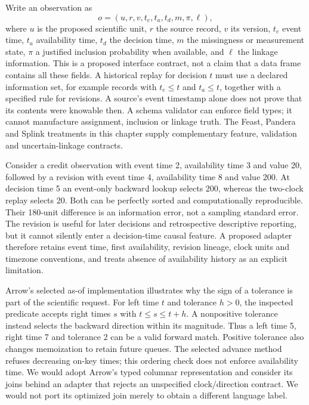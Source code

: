 Write an observation as
\[
 o=(u,r,v,t_e,t_a,t_d,m,\pi,\ell),
\]
where $u$ is the proposed scientific unit, $r$ the source record, $v$ its version, $t_e$ event time, $t_a$ availability time, $t_d$ the decision time, $m$ the missingness or measurement state, $\pi$ a justified inclusion probability when available, and $\ell$ the linkage information. This is a proposed interface contract, not a claim that a data frame contains all these fields. A historical replay for decision $t$ must use a declared information set, for example records with $t_e\leq t$ and $t_a\leq t$, together with a specified rule for revisions. A source's event timestamp alone does not prove that its contents were knowable then. A schema validator can enforce field types; it cannot manufacture assignment, inclusion or linkage truth. The Feast, Pandera and Splink treatments in this chapter supply complementary feature, validation and uncertain-linkage contracts.~\citep{exec19_feast_source,exec19_feast_reference,exec24_pandera_source,exec24_pandera_reference,exec24_splink_sources,exec24_splink_contract,exec25_dww_choice}

Consider a credit observation with event time 2, availability time 3 and value 20, followed by a revision with event time 4, availability time 8 and value 200. At decision time 5 an event-only backward lookup selects 200, whereas the two-clock replay selects 20. Both can be perfectly sorted and computationally reproducible. Their 180-unit difference is an information error, not a sampling standard error. The revision is useful for later decisions and retrospective descriptive reporting, but it cannot silently enter a decision-time causal feature. A proposed adapter therefore retains event time, first availability, revision lineage, clock units and timezone conventions, and treats absence of availability history as an explicit limitation.~\citep{exec25_dww_choice}

Arrow's selected as-of implementation illustrates why the sign of a tolerance is part of the scientific request. For left time $t$ and tolerance $h>0$, the inspected predicate accepts right times $s$ with $t\leq s\leq t+h$. A nonpositive tolerance instead selects the backward direction within its magnitude. Thus a left time 5, right time 7 and tolerance 2 can be a valid forward match. Positive tolerance also changes memoization to retain future queues. The selected advance method refuses decreasing on-key times; this ordering check does not enforce availability time. We would adopt Arrow's typed columnar representation and consider its joins behind an adapter that rejects an unspecified clock/direction contract. We would not port its optimized join merely to obtain a different language label.~\citep{exec25_dww_arrow,exec25_dww_choice}

